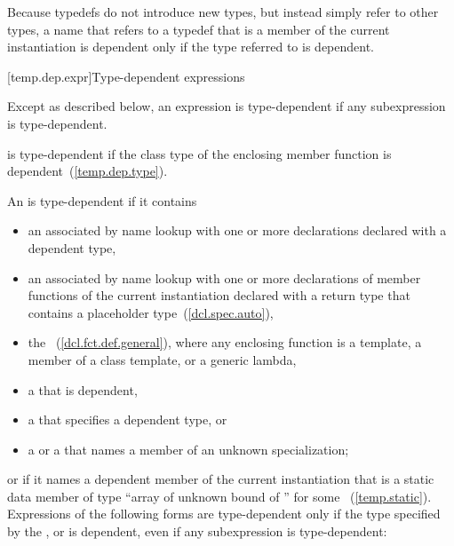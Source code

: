 \pnum
\enternote
Because typedefs do not introduce new types, but
instead simply refer to other types, a name that refers to a
typedef that is a member of the current instantiation is dependent
only if the type referred to is dependent.
\exitnote

[temp.dep.expr]{Type-dependent expressions}

\pnum
Except as described below, an expression is type-dependent if any
subexpression is type-dependent.

\pnum
{}
is type-dependent if the class type of the enclosing member function is
dependent~(\ref{temp.dep.type}).

\pnum
An
is type-dependent if it contains

\begin{itemize}
\item
an
associated by name lookup with one or more declarations
declared with a dependent type,

\item
an  associated by name lookup with one or more
declarations of member functions of the current instantiation declared
with a return type that contains a placeholder type~(\ref{dcl.spec.auto}),

\item
the
~(\ref{dcl.fct.def.general}), where any enclosing function is a
template, a member of a class template, or a generic lambda,

\item
a
that is dependent,

\item
a
that specifies a dependent type, or

\item
a
or a
that names a member of an unknown specialization;
\end{itemize}

or if it names a dependent member of the current instantiation that is a static
data member of type
``array of unknown bound of '' for some ~(\ref{temp.static}).
Expressions of the following forms are type-dependent only if the type
specified by the
,
or
is dependent, even if any subexpression is type-dependent:

